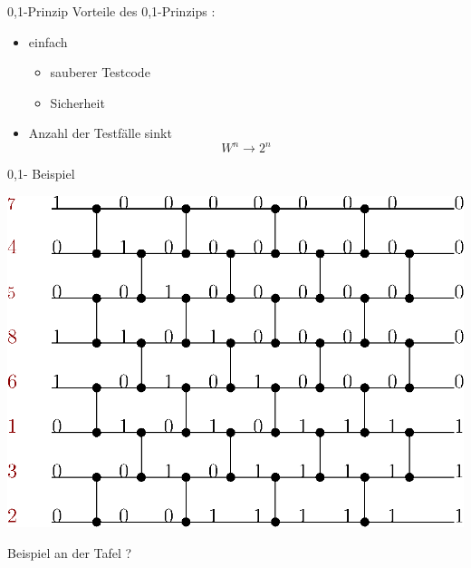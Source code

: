\documentclass[ucs,9pt]{beamer}
\begin{document}
\begin{frame}{0,1-Prinzip}
Vorteile des 0,1-Prinzips : 
\begin{itemize}
\item einfach 
	\begin{itemize}
		\item sauberer Testcode
		\item Sicherheit
	\end{itemize}
\item Anzahl der Testfälle sinkt \\ 
%
$$  W^n\rightarrow 2^n $$
\end{itemize}
\end{frame}

\begin{frame}{0,1- Beispiel}
 {
\begin{center}
\includegraphics[scale=0.8]{01beispiel.eps}
\end{center}
}
 {\begin{center} {\color{green}Beispiel an der Tafel ?}\end{center} }
\end{frame}
\end{document}
